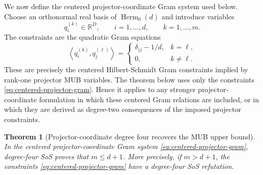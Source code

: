 \documentclass[11pt]{article}
\newtheorem{theorem}{Theorem}[section]
\theoremstyle{remark}
\newcommand{\R}{\mathbb{R}}
\newcommand{\ip}[2]{\left\langle #1,#2\right\rangle}
\newcommand{\Herm}{\operatorname{Herm}}
\begin{document}
We now define the centered projector-coordinate Gram system used below. Choose an orthonormal real basis of $\Herm_0(d)$ and introduce variables
\[
q_i^{(k)}\in\R^D,
\qquad i=1,\ldots,d,
\qquad k=1,\ldots,m.
\]
The constraints are the quadratic Gram equations
\begin{equation}\label{eq:centered-projector-gram}
\ip{q_i^{(k)}}{q_j^{(\ell)}}=
\begin{cases}
\delta_{ij}-1/d, & k=\ell,\\
0, & k\ne\ell.
\end{cases}
\end{equation}
These are precisely the centered Hilbert-Schmidt Gram constraints implied by rank-one projector MUB variables. The theorem below uses only the constraints \eqref{eq:centered-projector-gram}. Hence it applies to any stronger projector-coordinate formulation in which these centered Gram relations are included, or in which they are derived as degree-two consequences of the imposed projector constraints.

\begin{theorem}[Projector-coordinate degree four recovers the MUB upper bound]\label{thm:projector-bound}
In the centered projector-coordinate Gram system \eqref{eq:centered-projector-gram}, degree-four SoS proves that $m\le d+1$. More precisely, if $m>d+1$, the constraints \eqref{eq:centered-projector-gram} have a degree-four SoS refutation.
\end{theorem}
\end{document}
